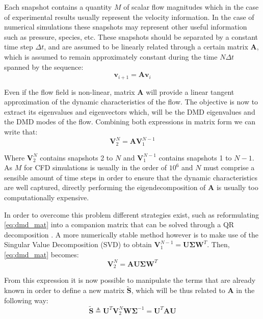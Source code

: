 Each snapshot contains a quantity $M$ of scalar flow magnitudes which in the case of experimental results usually represent the velocity information. In the case of numerical simulations these snapshots may represent other useful information such as pressure, species, etc. These snapshots should be separated by a constant time step $\Delta t$, and are assumed to be linearly related through a certain matrix $\mathbf A$, which is assumed to remain approximately constant during the time $N\Delta t$ spanned by the sequence:
\begin{equation}\label{eq:dmd_linear}
	\mathbf v_{i+1} = \mathbf A \mathbf v_i
\end{equation}

Even if the flow field is non-linear, matrix $\mathbf A$ will provide a linear tangent approximation of the dynamic characteristics of the flow. The objective is now to extract its eigenvalues and eigenvectors which, will be the DMD eigenvalues and the DMD modes of the flow. Combining both expressions in matrix form we can write that:
\begin{equation}\label{eq:dmd_mat}
	 \mathbf V_{2}^{N}=\mathbf A \mathbf V_{1}^{N-1}
\end{equation}

Where $\mathbf V_{2}^{N}$ contains snapshots 2 to $N$ and $\mathbf V_{1}^{N-1}$ contains snapshots 1 to $N-1$. As $M$ for CFD simulations is usually in the order of $10^6$ and $N$ must comprise a sensible amount of time steps in order to ensure that the dynamic characteristics are well captured, directly performing the eigendecomposition of $\mathbf A$ is usually too computationally expensive.

In order to overcome this problem different strategies exist, such as reformulating \ref{eq:dmd_mat} into a companion matrix that can be solved through a QR decomposition \cite{schmid2011applications,rowley2009spectral,bagheri2013koopman}. A more numerically stable method however is to make use of the Singular Value Decomposition (SVD) \cite{schmid2010dynamic,jovanovic2014sparsity,sakowitz2014flow,chen2012variants} to obtain $\mathbf V_1^{N-1} = \mathbf U \bm\Sigma\mathbf W^T$. Then, \ref{eq:dmd_mat} becomes:
\begin{equation}
	\mathbf V_2^N = \mathbf A \mathbf U \bm\Sigma \mathbf W^T
\end{equation}

From this expression it is now possible to manipulate the terms that are already known in order to define a new matrix $\widetilde{\mathbf{S}}$, which will be thus related to $\mathbf A$ in the following way:
\begin{equation}
	\widetilde{\mathbf{S}} \triangleq \mathbf U^T \mathbf V_2^N \mathbf W \bm\Sigma^{-1} = \mathbf U^T \mathbf A \mathbf U
\end{equation}

